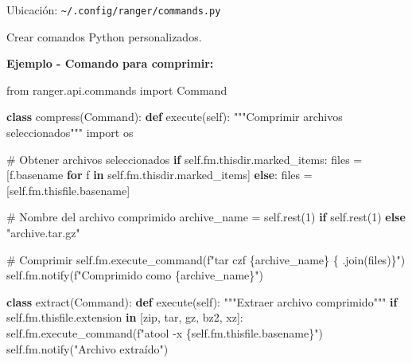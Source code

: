 \documentclass[
  doc,
  floatsintext,
  longtable,
  a4paper,
  nolmodern,
  notxfonts,
  notimes,
  12pt,
  colorlinks=true,linkcolor=blue,citecolor=blue,urlcolor=blue]{apa7}
\newenvironment{Shaded}{\begin{snugshade}}{\end{snugshade}}
\newcommand{\CommentTok}[1]{\textcolor[rgb]{0.37,0.37,0.37}{#1}}
\newcommand{\ControlFlowTok}[1]{\textcolor[rgb]{0.00,0.23,0.31}{\textbf{#1}}}
\newcommand{\DecValTok}[1]{\textcolor[rgb]{0.68,0.00,0.00}{#1}}
\newcommand{\ImportTok}[1]{\textcolor[rgb]{0.00,0.46,0.62}{#1}}
\newcommand{\KeywordTok}[1]{\textcolor[rgb]{0.00,0.23,0.31}{\textbf{#1}}}
\newcommand{\NormalTok}[1]{\textcolor[rgb]{0.00,0.23,0.31}{#1}}
\newcommand{\OperatorTok}[1]{\textcolor[rgb]{0.37,0.37,0.37}{#1}}
\newcommand{\SpecialCharTok}[1]{\textcolor[rgb]{0.37,0.37,0.37}{#1}}
\newcommand{\SpecialStringTok}[1]{\textcolor[rgb]{0.13,0.47,0.30}{#1}}
\newcommand{\StringTok}[1]{\textcolor[rgb]{0.13,0.47,0.30}{#1}}
\newcommand{\VariableTok}[1]{\textcolor[rgb]{0.07,0.07,0.07}{#1}}
\begin{document}
Ubicación: \texttt{\textasciitilde{}/.config/ranger/commands.py}

Crear comandos Python personalizados.

\textbf{Ejemplo - Comando para comprimir:}

\begin{Shaded}
\begin{Highlighting}[]
\ImportTok{from}\NormalTok{ ranger.api.commands }\ImportTok{import}\NormalTok{ Command}

\KeywordTok{class}\NormalTok{ compress(Command):}
    \KeywordTok{def}\NormalTok{ execute(}\VariableTok{self}\NormalTok{):}
        \CommentTok{"""Comprimir archivos seleccionados"""}
        \ImportTok{import}\NormalTok{ os}
        
        \CommentTok{\# Obtener archivos seleccionados}
        \ControlFlowTok{if} \VariableTok{self}\NormalTok{.fm.thisdir.marked\_items:}
\NormalTok{            files }\OperatorTok{=}\NormalTok{ [f.basename }\ControlFlowTok{for}\NormalTok{ f }\KeywordTok{in} \VariableTok{self}\NormalTok{.fm.thisdir.marked\_items]}
        \ControlFlowTok{else}\NormalTok{:}
\NormalTok{            files }\OperatorTok{=}\NormalTok{ [}\VariableTok{self}\NormalTok{.fm.thisfile.basename]}
        
        \CommentTok{\# Nombre del archivo comprimido}
\NormalTok{        archive\_name }\OperatorTok{=} \VariableTok{self}\NormalTok{.rest(}\DecValTok{1}\NormalTok{) }\ControlFlowTok{if} \VariableTok{self}\NormalTok{.rest(}\DecValTok{1}\NormalTok{) }\ControlFlowTok{else} \StringTok{"archive.tar.gz"}
        
        \CommentTok{\# Comprimir}
        \VariableTok{self}\NormalTok{.fm.execute\_command(}\SpecialStringTok{f"tar czf }\SpecialCharTok{\{}\NormalTok{archive\_name}\SpecialCharTok{\}}\SpecialStringTok{ }\SpecialCharTok{\{}\StringTok{\textquotesingle{} \textquotesingle{}}\SpecialCharTok{.}\NormalTok{join(files)}\SpecialCharTok{\}}\SpecialStringTok{"}\NormalTok{)}
        \VariableTok{self}\NormalTok{.fm.notify(}\SpecialStringTok{f"Comprimido como }\SpecialCharTok{\{}\NormalTok{archive\_name}\SpecialCharTok{\}}\SpecialStringTok{"}\NormalTok{)}

\KeywordTok{class}\NormalTok{ extract(Command):}
    \KeywordTok{def}\NormalTok{ execute(}\VariableTok{self}\NormalTok{):}
        \CommentTok{"""Extraer archivo comprimido"""}
        \ControlFlowTok{if} \VariableTok{self}\NormalTok{.fm.thisfile.extension }\KeywordTok{in}\NormalTok{ [}\StringTok{\textquotesingle{}zip\textquotesingle{}}\NormalTok{, }\StringTok{\textquotesingle{}tar\textquotesingle{}}\NormalTok{, }\StringTok{\textquotesingle{}gz\textquotesingle{}}\NormalTok{, }\StringTok{\textquotesingle{}bz2\textquotesingle{}}\NormalTok{, }\StringTok{\textquotesingle{}xz\textquotesingle{}}\NormalTok{]:}
            \VariableTok{self}\NormalTok{.fm.execute\_command(}\SpecialStringTok{f"atool {-}x }\SpecialCharTok{\{}\VariableTok{self}\SpecialCharTok{.}\NormalTok{fm}\SpecialCharTok{.}\NormalTok{thisfile}\SpecialCharTok{.}\NormalTok{basename}\SpecialCharTok{\}}\SpecialStringTok{"}\NormalTok{)}
            \VariableTok{self}\NormalTok{.fm.notify(}\StringTok{"Archivo extraído"}\NormalTok{)}


\end{Highlighting}
\end{Shaded}
\end{document}
